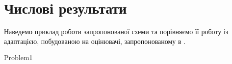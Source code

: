 
\section{Числові результати}

Наведемо приклад роботи запропонованої схеми та порівняємо
	її роботу із адаптацією, побудованою на оцінювачі, запропонованому в \cite{OstShynAee11}.

{Problem1}
